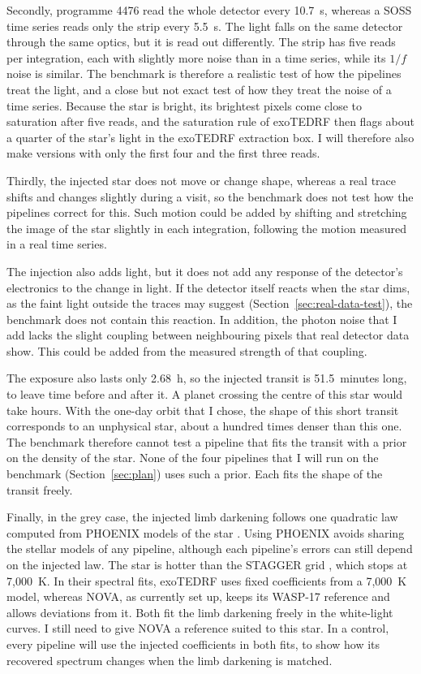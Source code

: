 Secondly, programme 4476 read the whole detector every 10.7~s, whereas a SOSS
time series reads only the strip every 5.5~s. The light falls on the same
detector through the same optics, but it is read out differently. The strip
has five reads per integration, each with slightly more noise than in a time
series, while its $1/f$ noise is similar. The benchmark is therefore a
realistic test of how the pipelines treat the light, and a close but not exact
test of how they treat the noise of a time series. Because the star is bright,
its brightest pixels come close to saturation after five reads, and the
saturation rule of exoTEDRF then flags about a quarter of the star's light in
the exoTEDRF extraction box. I will therefore also make versions with only the first four and the
first three reads.

Thirdly, the injected star does not move or change shape, whereas a real
trace shifts and changes slightly during a visit, so the benchmark does not
test how the pipelines correct for this. Such motion could be added by shifting and
stretching the image of the star slightly in each integration, following the
motion measured in a real time series.

The injection also adds light, but it does not add any response of the
detector's electronics to the change in light. If the detector itself reacts when the star dims, as the faint light outside the traces may suggest (Section~\ref{sec:real-data-test}), the benchmark does not contain this reaction. In addition, the
photon noise that I add lacks the slight coupling between neighbouring pixels that real detector data show. This could be added from the measured strength
of that coupling.

The exposure also lasts only 2.68~h, so the injected transit is
51.5~minutes long, to leave time before and after it. A planet crossing the
centre of this star would take hours. With the one-day orbit that I chose, the
shape of this short transit corresponds to an unphysical star, about a hundred
times denser than this one. The benchmark therefore cannot test a pipeline that
fits the transit with a prior on the density of the star. None of the four pipelines that I will run on the benchmark (Section~\ref{sec:plan}) uses such a prior. Each fits the shape
of the transit freely.

Finally, in the grey case, the injected limb darkening follows one quadratic law computed from PHOENIX models of the star \citep{HusserEtAl2013}. Using PHOENIX avoids sharing the stellar models of any pipeline, although each pipeline's errors can still depend on the injected law. The star is hotter than the STAGGER grid \citep{MagicEtAl2015}, which stops at 7,000~K. In their spectral fits, exoTEDRF uses fixed coefficients from a 7,000~K model, whereas NOVA, as currently set up, keeps its WASP-17 reference and allows deviations from it. Both fit the limb darkening freely in the white-light curves. I still need to give NOVA a reference suited to this star. In a control, every pipeline will use the injected coefficients in both fits, to show how its recovered spectrum changes when the limb darkening is matched.

